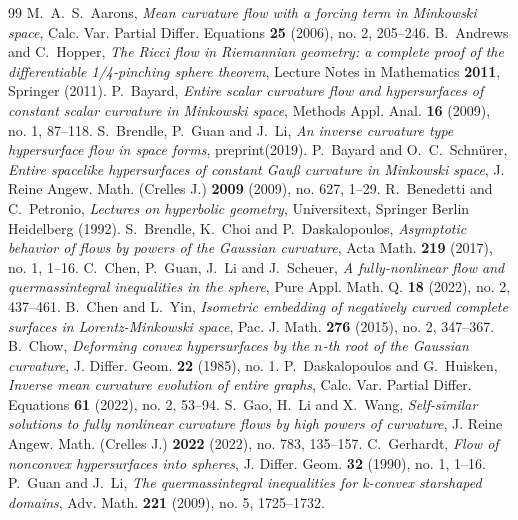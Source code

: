 \documentclass[10pt,a4paper]{amsart}
\numberwithin{equation}{section}
\begin{document}
\begin{thebibliography}{99}
 M.~A.~S.~Aarons, {\em Mean curvature flow with a forcing term in Minkowski space}, Calc. Var. Partial Differ. Equations {\bf 25} (2006), no. 2, 205--246.
 B.~Andrews and C.~Hopper, {\em The Ricci flow in Riemannian geometry: a complete proof of the differentiable 1/4-pinching sphere theorem}, Lecture Notes in Mathematics {\bf 2011}, Springer (2011).
 P.~Bayard, {\em Entire scalar curvature flow and hypersurfaces of constant scalar curvature in Minkowski space}, Methods Appl. Anal. {\bf 16} (2009), no. 1, 87--118.
 S.~Brendle, P.~Guan and J.~Li, {\em An inverse curvature type hypersurface flow in space forms}, preprint(2019).
 P.~Bayard and O.~C.~Schn\"{u}rer, {\em Entire spacelike hypersurfaces of constant Gau{\ss} curvature in Minkowski space}, J. Reine Angew. Math. (Crelles J.) {\bf 2009} (2009), no. 627, 1--29.
 R.~Benedetti and C.~Petronio, {\em Lectures on hyperbolic geometry}, Universitext, Springer Berlin Heidelberg (1992).
 S.~Brendle, K.~Choi and P.~Daskalopoulos, {\em Asymptotic behavior of flows by powers of the Gaussian curvature}, Acta Math. {\bf 219} (2017), no. 1, 1--16.
 C.~Chen, P.~Guan, J.~Li and J.~Scheuer, {\em A fully-nonlinear flow and quermassintegral inequalities in the sphere}, Pure Appl. Math. Q. {\bf 18} (2022), no. 2, 437--461.
 B.~Chen and L.~Yin, {\em Isometric embedding of negatively curved complete surfaces in Lorentz-Minkowski space}, Pac. J. Math. {\bf 276} (2015), no. 2, 347--367.
 B.~Chow, {\em Deforming convex hypersurfaces by the $n$-th root of the Gaussian curvature}, J. Differ. Geom. {\bf 22} (1985), no. 1.
 P.~Daskalopoulos and G.~Huisken, {\em Inverse mean curvature evolution of entire graphs}, Calc. Var. Partial Differ. Equations {\bf 61} (2022), no. 2, 53--94.
 S.~Gao, H.~Li and X.~Wang, {\em Self-similar solutions to fully nonlinear curvature flows by high powers of curvature}, J. Reine Angew. Math. (Crelles J.) {\bf 2022} (2022), no. 783, 135--157.
 C.~Gerhardt, {\em Flow of nonconvex hypersurfaces into spheres}, J. Differ. Geom. {\bf 32} (1990), no. 1, 1--16.
 P.~Guan and J.~Li, {\em The quermassintegral inequalities for k-convex starshaped domains}, Adv. Math. {\bf 221} (2009), no. 5, 1725--1732.

\end{thebibliography}
\end{document}
